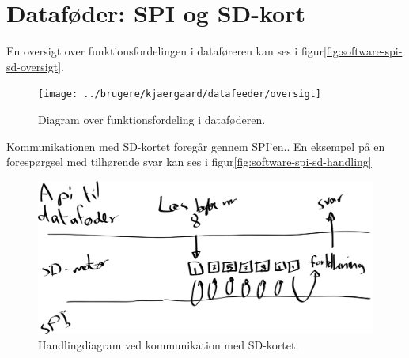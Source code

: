 \section{Dataføder: SPI og SD-kort}

En oversigt over funktionsfordelingen i
dataføreren kan ses i
figur\vref{fig:software-spi-sd-oversigt}.

\begin{figure}[htbp]
  \centering
  \texttt{[image: ../brugere/kjaergaard/datafeeder/oversigt]}
  \caption{Diagram over funktionsfordeling i dataføderen.}
  \label{fig:software-spi-sd-oversigt}
\end{figure}

Kommunikationen med SD-kortet foregår gennem SPI'en.. En eksempel på en forespørgsel med tilhørende svar
kan ses i figur\vref{fig:software-spi-sd-handling}

\begin{figure}[htbp]
  \centering
  \includegraphics[width=\textwidth]{../brugere/kjaergaard/datafeeder/handling}
  \caption{Handlingdiagram ved kommunikation med SD-kortet.}
  \label{fig:software-spi-sd-handling}
\end{figure}

